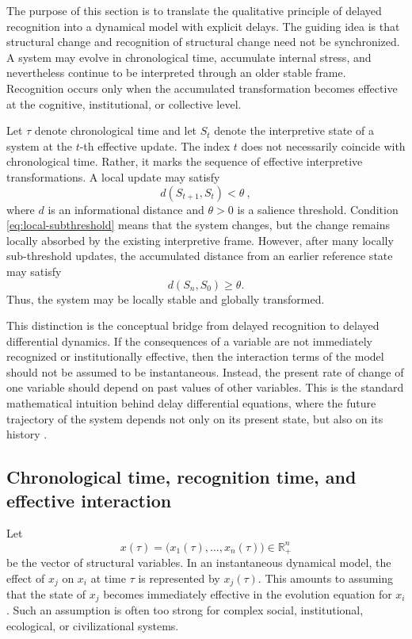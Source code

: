 \documentclass[11pt]{article}
\begin{document}
The purpose of this section is to translate the qualitative principle of
delayed recognition into a dynamical model with explicit delays. The guiding
idea is that structural change and recognition of structural change need not
be synchronized. A system may evolve in chronological time, accumulate internal
stress, and nevertheless continue to be interpreted through an older stable
frame. Recognition occurs only when the accumulated transformation becomes
effective at the cognitive, institutional, or collective level.

Let $\tau$ denote chronological time and let $S_t$ denote the interpretive state
of a system at the $t$-th effective update. The index $t$ does not necessarily
coincide with chronological time. Rather, it marks the sequence of effective
interpretive transformations. A local update may satisfy
\begin{equation}
d(S_{t+1},S_t)<\theta \ ,
\label{eq:local-subthreshold}
\end{equation}
where $d$ is an informational distance and $\theta>0$ is a salience threshold.
Condition \eqref{eq:local-subthreshold} means that the system changes, but the
change remains locally absorbed by the existing interpretive frame. However,
after many locally sub-threshold updates, the accumulated distance from an
earlier reference state may satisfy
\begin{equation}
d(S_n,S_0)\geq \theta.
\label{eq:global-threshold}
\end{equation}
Thus, the system may be locally stable and globally transformed.

This distinction is the conceptual bridge from delayed recognition to delayed
differential dynamics. If the consequences of a variable are not immediately
recognized or institutionally effective, then the interaction terms of the model
should not be assumed to be instantaneous. Instead, the present rate of change
of one variable should depend on past values of other variables. This is the
standard mathematical intuition behind delay differential equations, where the
future trajectory of the system depends not only on its present state, but also
on its history \cite{menon2021delayinduced,saeedian2022delay,pigani2022delay}.

\subsection{Chronological time, recognition time, and effective interaction}

Let
\[
x(\tau)=\big(x_1(\tau),\ldots,x_n(\tau)\big)\in\mathbb{R}^n_+
\]
be the vector of structural variables. In an instantaneous dynamical model, the
effect of $x_j$ on $x_i$ at time $\tau$ is represented by $x_j(\tau)$. This
amounts to assuming that the state of $x_j$ becomes immediately effective in the
evolution equation for $x_i$. Such an assumption is often too strong for complex
social, institutional, ecological, or civilizational systems.
\end{document}
